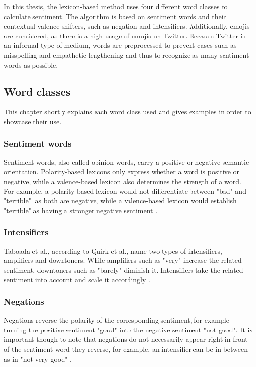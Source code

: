 In this thesis, the lexicon-based method uses four different word classes to calculate sentiment. The algorithm is based on sentiment words and their contextual valence shifters, such as negation and intensifiers. Additionally, emojis are considered, as there is a high usage of emojis on Twitter. Because Twitter is an informal type of medium, words are preprocessed to prevent cases such as misspelling and empathetic lengthening and thus to recognize as many sentiment words as possible.

\subsection{Word classes}
This chapter shortly explains each word class used and gives examples in order to showcase their use.

\subsubsection{Sentiment words}
Sentiment words, also called opinion words, carry a positive or negative semantic orientation. Polarity-based lexicons only express whether a word is positive or negative, while a valence-based lexicon also determines the strength of a word. For example, a polarity-based lexicon would not differentiate between "bad" and "terrible", as both are negative, while a valence-based lexicon would establish "terrible" as having a stronger negative sentiment \cite{DBLP:conf/icwsm/HuttoG14}.

\subsubsection{Intensifiers}
Taboada et al., according to Quirk et al., name two types of intensifiers, amplifiers and downtoners. While amplifiers such as "very" increase the related sentiment, downtoners such as "barely" diminish it. Intensifiers take the related sentiment into account and scale it accordingly \cite{taboada}.

\subsubsection{Negations}
Negations reverse the polarity of the corresponding sentiment, for example turning the positive sentiment "good" into the negative sentiment "not good". It is important though to note that negations do not necessarily appear right in front of the sentiment word they reverse, for example, an intensifier can be in between as in "not very good" \cite{taboada}.

